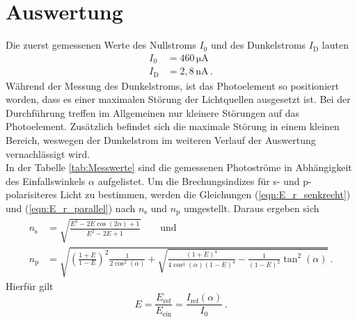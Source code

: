 


\nocite{anleitungV407}
\section{Auswertung}
\label{sec:Auswertung}
Die zuerst gemessenen Werte des Nullstroms $I_0$ und des Dunkelstroms $I_{\text{D}}$ lauten
\begin{align*}
  I_0 &= 460\,\unit{\micro\ampere}\\
  I_{\text{D}} &= 2,8\,\unit{\nano\ampere}\,.
\end{align*}
Während der Messung des Dunkelstroms, ist das Photoelement so positioniert worden, dass es einer maximalen 
Störung der Lichtquellen ausgesetzt ist. Bei der Durchführung treffen im Allgemeinen nur kleinere Störungen auf
das Photoelement. Zusätzlich befindet sich die maximale Störung in einem kleinen Bereich, weswegen der Dunkelstrom im weiteren Verlauf der Auswertung vernachlässigt wird.
\\In der Tabelle \ref{tab:Messwerte} sind die gemessenen Photoströme in Abhängigkeit des Einfallswinkels $\alpha$ aufgelistet.
Um die Brechungsindizes für s- und p-polarisiteres Licht zu bestimmen, werden die Gleichungen (\ref{eqn:E_r_senkrecht}) und (\ref{eqn:E_r_parallel}) nach $n_{\text{s}}$ und $n_{\text{p}}$
umgestellt. Daraus ergeben sich
\begin{align}
  n_{\text{s}} &= \sqrt{\frac{E^2 - 2E\cos(2\alpha) + 1}{E^2- 2E + 1}} \label{eqn:n_s} \qquad {\text{und}}\\
  n_{\text{p}} &= \sqrt{\left(\frac{1+E}{1-E}\right)^2 \frac{1}{2\cos^2(\alpha)} + \sqrt{\frac{(1+E)^4}{4\cos^4(\alpha)(1-E)^4}- \frac{1}{(1-E)^2} \tan^2(\alpha)}} \label{eqn:n_p}\,.
\end{align}
Hierfür gilt $$E = \frac{E_{\text{ref}}}{E_{\text{ein}}} = \frac{I_{\text{ref}}(\alpha)}{I_0}\,.$$
